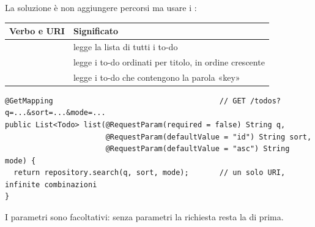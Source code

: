 La soluzione è non aggiungere percorsi ma usare i :
\begin{center}
\renewcommand{\arraystretch}{1.25}
\begin{tabular}{lP{8.6cm}}
\toprule
\textbf{Verbo e URI} & \textbf{Significato} \\
\midrule
{}                      & legge la lista di tutti i to-do \\
 & legge i to-do ordinati per titolo, in ordine crescente \\
                & legge i to-do che contengono la parola «key» \\
\bottomrule
\end{tabular}
\end{center}

\begin{lstlisting}[style=java, name=TodoController.java]
@GetMapping                                      // GET /todos?q=...&sort=...&mode=...
public List<Todo> list(@RequestParam(required = false) String q,
                       @RequestParam(defaultValue = "id") String sort,
                       @RequestParam(defaultValue = "asc") String mode) {
  return repository.search(q, sort, mode);       // un solo URI, infinite combinazioni
}
\end{lstlisting}
I parametri sono facoltativi: senza parametri la richiesta resta la  di prima.

